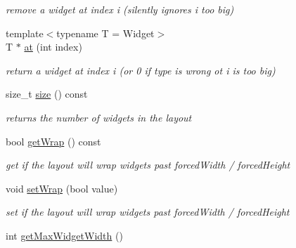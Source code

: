 \begin{DoxyCompactItemize}
\begin{DoxyCompactList}\small\item\em remove a widget at index \textquotesingle{}i\textquotesingle{} (silently ignores \textquotesingle{}i\textquotesingle{} too big) \end{DoxyCompactList}\item 
{\footnotesize template$<$typename T  = Widget$>$ }\\T $\ast$ \hyperlink{classcanvascv_1_1AutoLayout_a3735b4825af3732ebb183efdc55207f4}{at} (int index)\hypertarget{classcanvascv_1_1AutoLayout_a3735b4825af3732ebb183efdc55207f4}{}\label{classcanvascv_1_1AutoLayout_a3735b4825af3732ebb183efdc55207f4}

\begin{DoxyCompactList}\small\item\em return a widget at index \textquotesingle{}i\textquotesingle{} (or 0 if type is wrong ot \textquotesingle{}i\textquotesingle{} is too big) \end{DoxyCompactList}\item 
size\+\_\+t \hyperlink{classcanvascv_1_1AutoLayout_abda4b4eb07aab7d294b71f4135e1c8ed}{size} () const \hypertarget{classcanvascv_1_1AutoLayout_abda4b4eb07aab7d294b71f4135e1c8ed}{}\label{classcanvascv_1_1AutoLayout_abda4b4eb07aab7d294b71f4135e1c8ed}

\begin{DoxyCompactList}\small\item\em returns the number of widgets in the layout \end{DoxyCompactList}\item 
bool \hyperlink{classcanvascv_1_1AutoLayout_a33fda3ba2a72e60eec6f9cfec5bcea53}{get\+Wrap} () const \hypertarget{classcanvascv_1_1AutoLayout_a33fda3ba2a72e60eec6f9cfec5bcea53}{}\label{classcanvascv_1_1AutoLayout_a33fda3ba2a72e60eec6f9cfec5bcea53}

\begin{DoxyCompactList}\small\item\em get if the layout will wrap widgets past forced\+Width / forced\+Height \end{DoxyCompactList}\item 
void \hyperlink{classcanvascv_1_1AutoLayout_a633172f81a61be4e6840457ea538a694}{set\+Wrap} (bool value)\hypertarget{classcanvascv_1_1AutoLayout_a633172f81a61be4e6840457ea538a694}{}\label{classcanvascv_1_1AutoLayout_a633172f81a61be4e6840457ea538a694}

\begin{DoxyCompactList}\small\item\em set if the layout will wrap widgets past forced\+Width / forced\+Height \end{DoxyCompactList}\item 
int \hyperlink{classcanvascv_1_1AutoLayout_adc7737dce041188285c0026efb3d7c08}{get\+Max\+Widget\+Width} ()\hypertarget{classcanvascv_1_1AutoLayout_adc7737dce041188285c0026efb3d7c08}{}\label{classcanvascv_1_1AutoLayout_adc7737dce041188285c0026efb3d7c08}


\end{DoxyCompactItemize}
